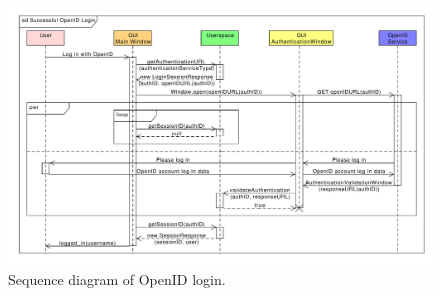 \begin{figure}[h]
\begin{center}
\includegraphics[scale=0.55, angle=90]{figures/openid_login_sequence.pdf}
\end{center}
\caption{Sequence diagram of OpenID login.}\label{rpc:sd:openid_login}
\end{figure}
